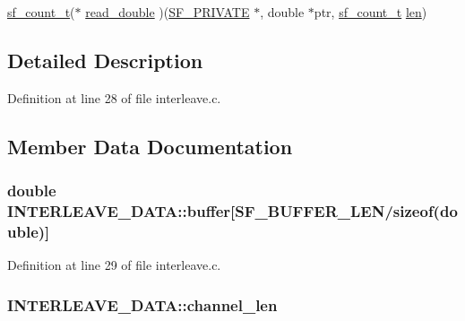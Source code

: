 \begin{DoxyCompactItemize}
\item 
\hyperlink{mac_2config_2i386_2lib-src_2libsndfile_2src_2sndfile_8h_a398121a5f562230ea7f772528fff5f84}{sf\+\_\+count\+\_\+t}($\ast$ \hyperlink{struct_i_n_t_e_r_l_e_a_v_e___d_a_t_a_a34754e9d2a32eeac3370db810ca9bcd4}{read\+\_\+double} )(\hyperlink{libsndfile_2src_2common_8h_ab5debd339ecaf40f50a223e218900c24}{S\+F\+\_\+\+P\+R\+I\+V\+A\+TE} $\ast$, double $\ast$ptr, \hyperlink{mac_2config_2i386_2lib-src_2libsndfile_2src_2sndfile_8h_a398121a5f562230ea7f772528fff5f84}{sf\+\_\+count\+\_\+t} \hyperlink{lib_2expat_8h_af86d325fecfc8f47b61fbf5a5146f582}{len})
\end{DoxyCompactItemize}


\subsection{Detailed Description}


Definition at line 28 of file interleave.\+c.



\subsection{Member Data Documentation}
\subsubsection[{\texorpdfstring{buffer}{buffer}}]{\setlength{\rightskip}{0pt plus 5cm}double I\+N\+T\+E\+R\+L\+E\+A\+V\+E\+\_\+\+D\+A\+T\+A\+::buffer\mbox{[}{\bf S\+F\+\_\+\+B\+U\+F\+F\+E\+R\+\_\+\+L\+EN}/sizeof(double)\mbox{]}}\hypertarget{struct_i_n_t_e_r_l_e_a_v_e___d_a_t_a_aa1313eca4d1a109db9324ff43a492239}{}\label{struct_i_n_t_e_r_l_e_a_v_e___d_a_t_a_aa1313eca4d1a109db9324ff43a492239}


Definition at line 29 of file interleave.\+c.

\subsubsection[{\texorpdfstring{channel\+\_\+len}{channel_len}}]{ I\+N\+T\+E\+R\+L\+E\+A\+V\+E\+\_\+\+D\+A\+T\+A\+::channel\+\_\+len}\hypertarget{struct_i_n_t_e_r_l_e_a_v_e___d_a_t_a_adc56c5b5d8352de02860a8a406171500}{}\label{struct_i_n_t_e_r_l_e_a_v_e___d_a_t_a_adc56c5b5d8352de02860a8a406171500}


